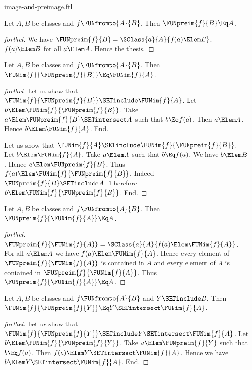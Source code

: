 \documentclass{stex}
\begin{document}
\begin{smodule}{image-and-preimage.ftl}
\begin{proposition}[forthel,id=FOUNDATIONS_07_6541963008409600]
  Let $A, B$ be classes and $f \FUNfromto{A}{B}$.
  Then $\FUNpreim{f}{B} \Eq A$.
\end{proposition}
\begin{proof}[forthel]
  We have $\FUNpreim{f}{B} = \SClass{a}{A}{f(a) \Elem B}$.
  $f(a) \Elem B$ for all $a \Elem A$.
  Hence the thesis.
\end{proof}

\begin{proposition}[forthel,id=FOUNDATIONS_07_1913313581596672]
  Let $A, B$ be classes and $f \FUNfromto{A}{B}$.
  Then $\FUNim{f}{\FUNpreim{f}{B}} \Eq \FUNim{f}{A}$.
\end{proposition}
\begin{proof}[forthel]
  Let us show that $\FUNim{f}{\FUNpreim{f}{B}} \SETinclude \FUNim{f}{A}$.
    Let $b \Elem \FUNim{f}{\FUNpreim{f}{B}}$.
    Take $a \Elem \FUNpreim{f}{B} \SETintersect A$ such that $b \Eq f(a)$.
    Then $a \Elem A$.
    Hence $b \Elem \FUNim{f}{A}$.
  End.

  Let us show that $\FUNim{f}{A} \SETinclude \FUNim{f}{\FUNpreim{f}{B}}$.
    Let $b \Elem \FUNim{f}{A}$.
    Take $a \Elem A$ such that $b \Eq f(a)$.
    We have $b \Elem B$.
    Hence $a \Elem \FUNpreim{f}{B}$.
    Thus $f(a) \Elem \FUNim{f}{\FUNpreim{f}{B}}$.
    Indeed $\FUNpreim{f}{B} \SETinclude A$.
    Therefore $b \Elem \FUNim{f}{\FUNpreim{f}{B}}$.
  End.
\end{proof}

\begin{proposition}[forthel,id=FOUNDATIONS_07_3819758101200896]
  Let $A, B$ be classes and $f \FUNfromto{A}{B}$.
  Then $\FUNpreim{f}{\FUNim{f}{A}} \Eq A$.
\end{proposition}
\begin{proof}[forthel]
  $\FUNpreim{f}{\FUNim{f}{A}} = \SClass{a}{A}{f(a) \Elem \FUNim{f}{A}}$.
  For all $a \Elem A$ we have $f(a) \Elem \FUNim{f}{A}$.
  Hence every element of $\FUNpreim{f}{\FUNim{f}{A}}$ is contained in $A$ and every element of $A$ is contained in $\FUNpreim{f}{\FUNim{f}{A}}$.
  Thus $\FUNpreim{f}{\FUNim{f}{A}} \Eq A$.
\end{proof}

\begin{proposition}[forthel,id=FOUNDATIONS_07_7760514696347648]
  Let $A, B$ be classes and $f \FUNfromto{A}{B}$ and $Y \SETinclude B$.
  Then $\FUNim{f}{\FUNpreim{f}{Y}} \Eq Y \SETintersect \FUNim{f}{A}$.
\end{proposition}
\begin{proof}[forthel]
  Let us show that $\FUNim{f}{\FUNpreim{f}{Y}} \SETinclude Y \SETintersect \FUNim{f}{A}$.
    Let $b \Elem \FUNim{f}{\FUNpreim{f}{Y}}$.
    Take $a \Elem \FUNpreim{f}{Y}$ such that $b \Eq f(a)$.
    Then $f(a) \Elem Y \SETintersect \FUNim{f}{A}$.
    Hence we have $b \Elem Y \SETintersect \FUNim{f}{A}$.
  End.


\end{proof}
\end{smodule}
\end{document}
